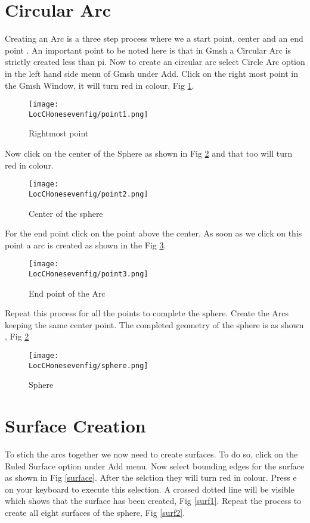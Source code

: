 \section{Circular Arc}

Creating an Arc is a three step process where we a start point, center and an end point . An important point to be noted here is that in Gmsh a Circular Arc is strictly created less than pi. Now to create an circular arc select Circle Arc option in the left hand side menu of Gmsh under Add. Click on the right most point in the Gmsh Window, it will turn red in colour, Fig \ref {point1}.

\begin{figure}[h]  
\centering
\texttt{[image: \\LocCHonesevenfig/point1.png]}
\caption{Rightmost point}
\label{point1}
\end{figure}

\flushleft Now click on the center of the Sphere as shown in Fig \ref{point2} and that too will turn red in colour.

\begin{figure}[h]  
\centering
\texttt{[image: \\LocCHonesevenfig/point2.png]}
\caption{Center of the sphere}
\label{point2}
\end{figure}

\flushleft For the end point click on the point above the center. As soon as we click on this point a arc is created as shown in the Fig \ref{point3}.

\begin{figure}[h]  
\centering
\texttt{[image: \\LocCHonesevenfig/point3.png]}
\caption{End point of the Arc}
\label{point3}
\end{figure}

\flushleft Repeat this process for all the points to complete the sphere. Create the Arcs keeping the same center point. The completed geometry of the sphere is as shown , Fig \ref{}

\begin{figure}[h]  
\centering
\texttt{[image: \\LocCHonesevenfig/sphere.png]}
\caption{Sphere}
\label{sphere}
\end{figure}

\section{Surface Creation}

To stich the arcs together we now need to create surfaces. To do so, click on the Ruled Surface option under Add menu. Now select bounding edges for the surface as shown in Fig \ref{surface}. After the selction they will turn red in colour. Press e on your keyboard to execute this selection. A crossed dotted line will be visible which shows that the surface has been created, Fig \ref{surf1}. Repeat the process to create all eight surfaces of the sphere, Fig \ref{surf2}.

